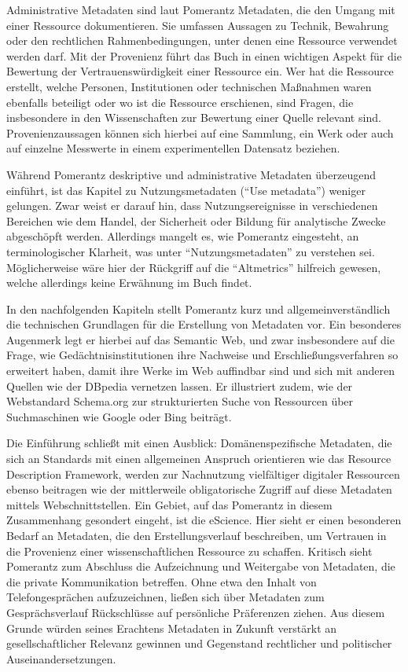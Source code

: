 \documentclass[a4paper,
fontsize=11pt,
oneside,
numbers=noperiodatend,
parskip=half-,
bibliography=totoc,
final
]{scrartcl}
\begin{document}
Administrative Metadaten sind laut Pomerantz Metadaten, die den Umgang
mit einer Ressource dokumentieren. Sie umfassen Aussagen zu Technik,
Bewahrung oder den rechtlichen Rahmenbedingungen, unter denen eine
Ressource verwendet werden darf. Mit der Provenienz führt das Buch in
einen wichtigen Aspekt für die Bewertung der Vertrauenswürdigkeit einer
Ressource ein. Wer hat die Ressource erstellt, welche Personen,
Institutionen oder technischen Maßnahmen waren ebenfalls beteiligt oder
wo ist die Ressource erschienen, sind Fragen, die insbesondere in den
Wissenschaften zur Bewertung einer Quelle relevant sind.
Provenienzaussagen können sich hierbei auf eine Sammlung, ein Werk oder
auch auf einzelne Messwerte in einem experimentellen Datensatz beziehen.

Während Pomerantz deskriptive und administrative Metadaten überzeugend
einführt, ist das Kapitel zu Nutzungsmetadaten (\enquote{Use metadata})
weniger gelungen. Zwar weist er darauf hin, dass Nutzungsereignisse in
verschiedenen Bereichen wie dem Handel, der Sicherheit oder Bildung für
analytische Zwecke abgeschöpft werden. Allerdings mangelt es, wie
Pomerantz eingesteht, an terminologischer Klarheit, was unter
\enquote{Nutzungsmetadaten} zu verstehen sei. Möglicherweise wäre hier
der Rückgriff auf die \enquote{Altmetrics} hilfreich gewesen, welche
allerdings keine Erwähnung im Buch findet.

In den nachfolgenden Kapiteln stellt Pomerantz kurz und
allgemeinverständlich die technischen Grundlagen für die Erstellung von
Metadaten vor. Ein besonderes Augenmerk legt er hierbei auf das Semantic
Web, und zwar insbesondere auf die Frage, wie Gedächtnisinstitutionen
ihre Nachweise und Erschließungsverfahren so erweitert haben, damit ihre
Werke im Web auffindbar sind und sich mit anderen Quellen wie der
DBpedia vernetzen lassen. Er illustriert zudem, wie der Webstandard
Schema.org zur strukturierten Suche von Ressourcen über Suchmaschinen
wie Google oder Bing beiträgt.

Die Einführung schließt mit einen Ausblick: Domänenspezifische
Metadaten, die sich an Standards mit einen allgemeinen Anspruch
orientieren wie das Resource Description Framework, werden zur
Nachnutzung vielfältiger digitaler Ressourcen ebenso beitragen wie der
mittlerweile obligatorische Zugriff auf diese Metadaten mittels
Webschnittstellen. Ein Gebiet, auf das Pomerantz in diesem Zusammenhang
gesondert eingeht, ist die eScience. Hier sieht er einen besonderen
Bedarf an Metadaten, die den Erstellungsverlauf beschreiben, um
Vertrauen in die Provenienz einer wissenschaftlichen Ressource zu
schaffen. Kritisch sieht Pomerantz zum Abschluss die Aufzeichnung und
Weitergabe von Metadaten, die die private Kommunikation betreffen. Ohne
etwa den Inhalt von Telefongesprächen aufzuzeichnen, ließen sich über
Metadaten zum Gesprächsverlauf Rückschlüsse auf persönliche Präferenzen
ziehen. Aus diesem Grunde würden seines Erachtens Metadaten in Zukunft
verstärkt an gesellschaftlicher Relevanz gewinnen und Gegenstand
rechtlicher und politischer Auseinandersetzungen.
\end{document}
